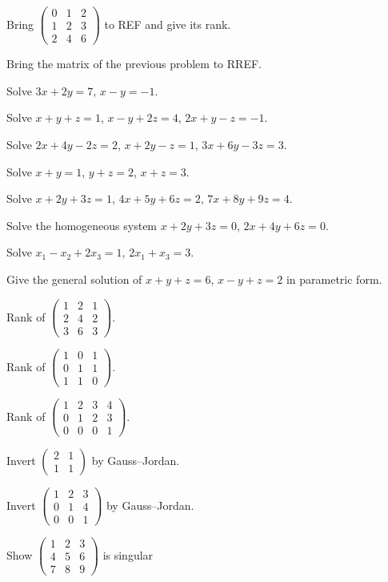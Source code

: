 \begin{problems}
  \item Bring $\begin{pmatrix}0&1&2\\1&2&3\\2&4&6\end{pmatrix}$ to REF and
        give its rank.
  \item Bring the matrix of the previous problem to RREF.
  \item Solve $3x+2y=7$, \;$x-y=-1$.
  \item Solve $x+y+z=1$, \;$x-y+2z=4$, \;$2x+y-z=-1$.
  \item Solve $2x+4y-2z=2$, \;$x+2y-z=1$, \;$3x+6y-3z=3$.
  \item Solve $x+y=1$, \;$y+z=2$, \;$x+z=3$.
  \item Solve $x+2y+3z=1$, \;$4x+5y+6z=2$, \;$7x+8y+9z=4$.
  \item Solve the homogeneous system $x+2y+3z=0$, \;$2x+4y+6z=0$.
  \item Solve $x_{1}-x_{2}+2x_{3}=1$, \;$2x_{1}+x_{3}=3$.
  \item Give the general solution of $x+y+z=6$, \;$x-y+z=2$ in parametric
        form.
  \item Rank of $\begin{pmatrix}1&2&1\\2&4&2\\3&6&3\end{pmatrix}$.
  \item Rank of $\begin{pmatrix}1&0&1\\0&1&1\\1&1&0\end{pmatrix}$.
  \item Rank of $\begin{pmatrix}1&2&3&4\\0&1&2&3\\0&0&0&1\end{pmatrix}$.
  \item Invert $\begin{pmatrix}2&1\\1&1\end{pmatrix}$ by Gauss--Jordan.
  \item Invert $\begin{pmatrix}1&2&3\\0&1&4\\0&0&1\end{pmatrix}$ by
        Gauss--Jordan.
  \item Show $\begin{pmatrix}1&2&3\\4&5&6\\7&8&9\end{pmatrix}$ is singular

\end{problems}
